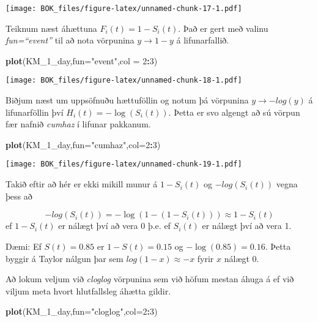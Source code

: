 \documentclass[
]{book}
\newenvironment{Shaded}{\begin{snugshade}}{\end{snugshade}}
\newcommand{\DataTypeTok}[1]{\textcolor[rgb]{0.13,0.29,0.53}{#1}}
\newcommand{\DecValTok}[1]{\textcolor[rgb]{0.00,0.00,0.81}{#1}}
\newcommand{\KeywordTok}[1]{\textcolor[rgb]{0.13,0.29,0.53}{\textbf{#1}}}
\newcommand{\NormalTok}[1]{#1}
\newcommand{\OperatorTok}[1]{\textcolor[rgb]{0.81,0.36,0.00}{\textbf{#1}}}
\newcommand{\StringTok}[1]{\textcolor[rgb]{0.31,0.60,0.02}{#1}}
\begin{document}
\texttt{[image: BOK\_files/figure-latex/unnamed-chunk-17-1.pdf]}

Teiknum næst áhættuna \(F_i(t)=1-S_i(t)\). Það er gert með valinu \emph{fun=``event''} til að nota vörpunina \(y \to 1-y\) á lifunarfallið.

\begin{Shaded}
\begin{Highlighting}[]
\KeywordTok{plot}\NormalTok{(KM\_}\DecValTok{1}\NormalTok{\_day,}\DataTypeTok{fun=}\StringTok{"event"}\NormalTok{,}\DataTypeTok{col =} \DecValTok{2}\OperatorTok{:}\DecValTok{3}\NormalTok{)}
\end{Highlighting}
\end{Shaded}

\texttt{[image: BOK\_files/figure-latex/unnamed-chunk-18-1.pdf]}

Biðjum næst um uppsöfnuðu hættuföllin og notum þá vörpunina \(y \to -log(y)\) á lifunarföllin því \(H_i(t) = -\log(S_i(t))\). Þetta er svo algengt að sú vörpun fær nafnið \emph{cumhaz} í lifunar pakkanum.

\begin{Shaded}
\begin{Highlighting}[]
\KeywordTok{plot}\NormalTok{(KM\_}\DecValTok{1}\NormalTok{\_day,}\DataTypeTok{fun=}\StringTok{"cumhaz"}\NormalTok{,}\DataTypeTok{col=}\DecValTok{2}\OperatorTok{:}\DecValTok{3}\NormalTok{)}
\end{Highlighting}
\end{Shaded}

\texttt{[image: BOK\_files/figure-latex/unnamed-chunk-19-1.pdf]}

Takið eftir að hér er ekki mikill munur á \(1-S_i(t)\) og \(-log(S_i(t))\) vegna þess að

\[
-log(S_i(t))=-\log(1-(1-S_i(t))) \approx 1-S_i(t)
\]
ef \(1-S_i(t)\) er nálægt því að vera 0 þ.e. ef \(S_i(t)\) er nálægt því að vera 1.

Dæmi: Ef \(S(t)=0.85\) er \(1-S(t)=0.15\) og \(-\log(0.85)=0.16\). Þetta byggir á Taylor nálgun þar sem \(log(1-x) \approx -x\) fyrir \(x\) nálægt 0.

Að lokum veljum við \emph{cloglog} vörpunina sem við höfum mestan áhuga á ef við viljum meta hvort hlutfallsleg áhætta gildir.

\begin{Shaded}
\begin{Highlighting}[]
\KeywordTok{plot}\NormalTok{(KM\_}\DecValTok{1}\NormalTok{\_day,}\DataTypeTok{fun=}\StringTok{"cloglog"}\NormalTok{,}\DataTypeTok{col=}\DecValTok{2}\OperatorTok{:}\DecValTok{3}\NormalTok{)}
\end{Highlighting}
\end{Shaded}
\end{document}
